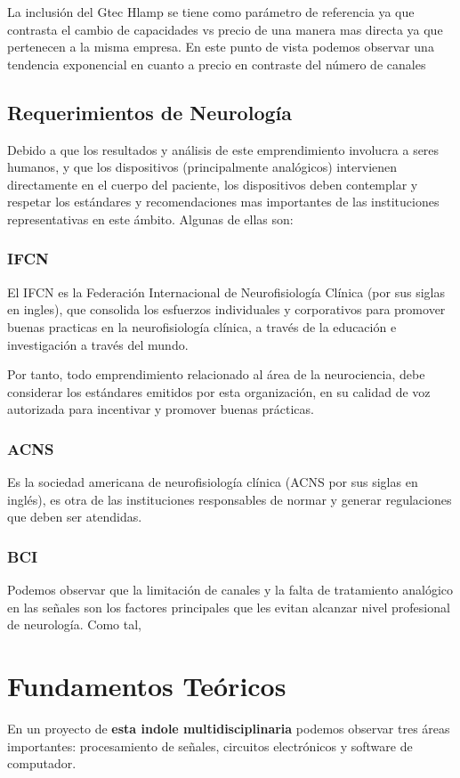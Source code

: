 La inclusión del Gtec Hlamp se tiene como parámetro de referencia ya que contrasta el cambio de capacidades vs precio de una manera mas directa ya que pertenecen a la misma empresa. En este punto de vista podemos observar una tendencia exponencial en cuanto a precio en contraste del número de canales

\subsection{Requerimientos de Neurología}
\label{sec:org717e77e}
Debido a que los resultados y análisis de este emprendimiento involucra a seres humanos, y que los dispositivos (principalmente analógicos) intervienen directamente en el cuerpo del paciente, los dispositivos deben contemplar y respetar los estándares y recomendaciones mas importantes de las instituciones representativas en este ámbito. Algunas de ellas son:

\subsubsection{IFCN}
\label{sec:orgc8742e5}
El IFCN es la Federación Internacional de Neurofisiología Clínica (por sus siglas en ingles), que consolida los esfuerzos individuales y corporativos para promover buenas practicas en la neurofisiología clínica, a través de la educación e investigación a través del mundo.

Por tanto, todo emprendimiento relacionado al área de la neurociencia, debe considerar los estándares emitidos por esta organización, en su calidad de voz autorizada para incentivar y promover buenas prácticas.

\subsubsection{ACNS}
\label{sec:orgf0c074b}
Es la sociedad americana de neurofisiología clínica (ACNS por sus siglas en inglés), es otra de las instituciones responsables de normar y generar regulaciones que deben ser atendidas.
\subsubsection{BCI}
\label{sec:org9f3a4f3}
Podemos observar que la limitación de canales y la falta de tratamiento analógico en las señales son los factores principales que les evitan alcanzar nivel profesional de neurología. Como tal,

\section{Fundamentos Teóricos}
\label{sec:org4e011cc}
En un proyecto de \textbf{esta indole multidisciplinaria} podemos observar tres áreas importantes: procesamiento de señales, circuitos electrónicos y software de computador.

